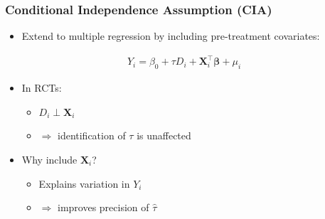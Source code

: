 \documentclass[12pt, compress]{beamer}
\begin{document}
\begin{frame}
	\frametitle{Conditional Independence Assumption (CIA)}

\begin{itemize}
	\item Extend to multiple regression by including pre-treatment covariates:
\end{itemize}

\begin{align*}
	Y_i = \beta_0 + \tau D_i + \mathbf{X}_i^{\top}\boldsymbol{\beta} + \mu_i
\end{align*}

\begin{itemize}
	\item In RCTs:
	\begin{itemize}
		\item $D_i \perp \mathbf{X}_i$
		\item $\Rightarrow$ identification of $\tau$ is unaffected
	\end{itemize}
	
	\medskip
	
	\item Why include $\mathbf{X}_i$?
	\begin{itemize}
		\item Explains variation in $Y_i$
		\item $\Rightarrow$ improves precision of $\hat{\tau}$
	\end{itemize}
\end{itemize}

\end{frame}
\end{document}
